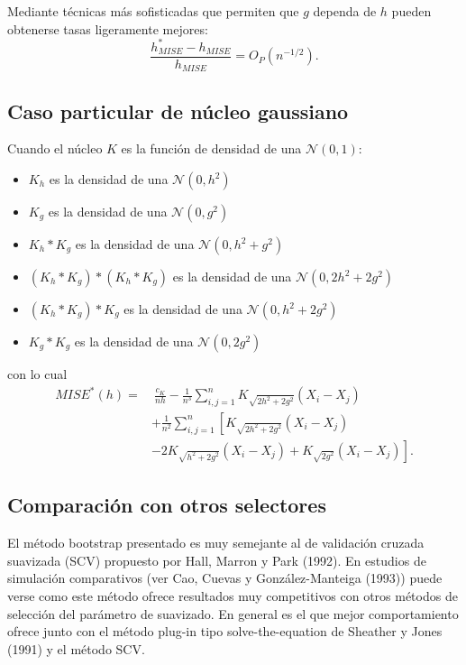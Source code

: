 \documentclass[]{book}
\theoremstyle{break}
\theoremstyle{definition}
\theoremstyle{definition}
\theoremstyle{definition}
\theoremstyle{remark}
\begin{document}
Mediante técnicas más sofisticadas que permiten que \(g\) dependa de
\(h\) pueden obtenerse tasas ligeramente
mejores:\[\frac{h_{MISE}^{\ast}-h_{MISE}}{h_{MISE}}=O_{P}\left( n^{-1/2} \right).\]

\subsection{Caso particular de núcleo
gaussiano}\label{caso-particular-de-nuxfacleo-gaussiano}

Cuando el núcleo \(K\) es la función de densidad de una
\(\mathcal{N}\left( 0,1 \right)\):

\begin{itemize}
\item
  \(K_{h}\) es la densidad de una \(\mathcal{N}\left( 0,h^2 \right)\)
\item
  \(K_{g}\) es la densidad de una \(\mathcal{N}\left( 0,g^2 \right)\)
\item
  \(K_{h}\ast K_{g}\) es la densidad de una
  \(\mathcal{N}\left( 0,h^2+g^2 \right)\)
\item
  \(\left( K_{h}\ast K_{g} \right) \ast \left( K_{h}\ast K_{g} \right)\)
  es la densidad de una \(\mathcal{N}\left( 0,2h^2+2g^2 \right)\)
\item
  \(\left( K_{h}\ast K_{g} \right) \ast K_{g}\) es la densidad de una
  \(\mathcal{N}\left( 0,h^2+2g^2 \right)\)
\item
  \(K_{g}\ast K_{g}\) es la densidad de una
  \(\mathcal{N}\left( 0,2g^2 \right)\)
\end{itemize}

con lo cual \[\begin{aligned}
MISE^{\ast}\left( h \right) =&\ \frac{c_{K}}{nh}-\frac{1}{n^{3}}
\sum_{i,j=1}^{n}K_{\sqrt{2h^2+2g^2}}\left( X_i-X_j \right) \\
&+\frac{1}{n^2}\sum_{i,j=1}^{n}\left[ K_{\sqrt{2h^2+2g^2}}\left(
X_i-X_j \right) \right. \\
&\left. -2K_{\sqrt{h^2+2g^2}}\left( X_i-X_j \right) +K_{\sqrt{2g^2}
}\left( X_i-X_j \right) \right] .
\end{aligned}\]

\subsection{Comparación con otros
selectores}\label{comparaciuxf3n-con-otros-selectores}

El método bootstrap presentado es muy semejante al de validación cruzada
suavizada (SCV) propuesto por Hall, Marron y Park (1992). En estudios de
simulación comparativos (ver Cao, Cuevas y González-Manteiga (1993))
puede verse como este método ofrece resultados muy competitivos con
otros métodos de selección del parámetro de suavizado. En general es el
que mejor comportamiento ofrece junto con el método plug-in tipo
solve-the-equation de Sheather y Jones (1991) y el método SCV.
\end{document}

